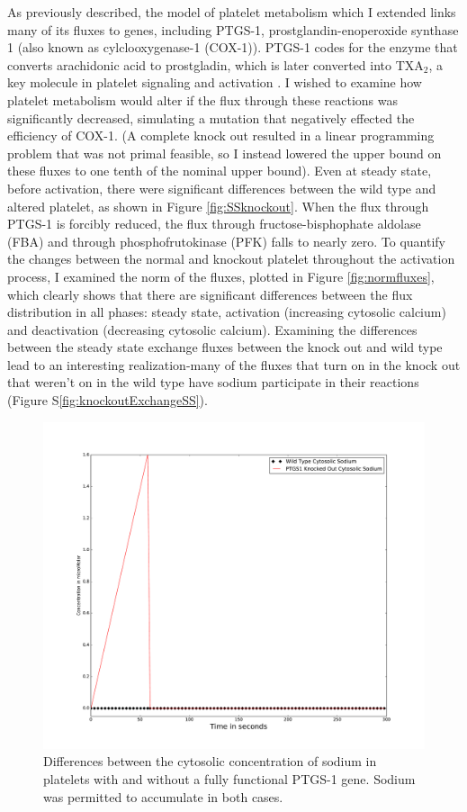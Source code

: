 \documentclass[11pt]{article}
\begin{document}
As previously described, the model of platelet metabolism which I extended links many of its fluxes to genes, including PTGS-1, prostglandin-enoperoxide synthase 1 (also known as cylclooxygenase-1 (COX-1)). PTGS-1 codes for the enzyme that converts arachidonic acid to prostgladin, which is later converted into TXA$_2$, a key molecule in platelet signaling and activation \cite{kunicki2010genetics}. I wished to examine how platelet metabolism would alter if the flux through these reactions was significantly decreased, simulating a mutation that negatively effected the efficiency of COX-1. (A complete knock out resulted in a linear programming problem that was not primal feasible, so I instead lowered the upper bound on these fluxes to one tenth of the nominal upper bound). Even at steady state, before activation, there were significant differences between the wild type and altered platelet, as shown in Figure \ref{fig:SSknockout}. When the flux through PTGS-1 is forcibly reduced, the flux through fructose-bisphophate aldolase (FBA) and through phosphofrutokinase (PFK) falls to nearly zero. To quantify the changes between the normal and knockout platelet throughout the activation process, I examined the norm of the fluxes, plotted in Figure \ref{fig:normfluxes}, which clearly shows that there are significant differences between the flux distribution in all phases: steady state, activation (increasing cytosolic calcium) and deactivation (decreasing cytosolic calcium). Examining the differences between the steady state exchange fluxes between the knock out and wild type lead to an interesting realization-many of the fluxes that turn on in the knock out that weren't on in the wild type have sodium participate in their reactions (Figure S\ref{fig:knockoutExchangeSS}).
\begin{figure}
\centering
\includegraphics[scale=.25]{../figures/cytosolicNa}
\caption{Differences between the cytosolic concentration of sodium in platelets with and without a fully functional PTGS-1 gene. Sodium was permitted to accumulate in both cases.}
\label{fig:cytoNa}
\end{figure}
\end{document}
